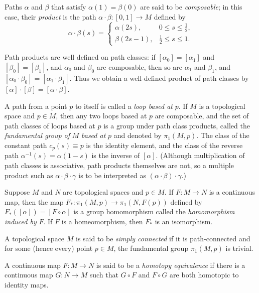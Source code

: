 Paths $\alpha$ and $\beta$ that satisfy $\alpha(1) = \beta(0)$ are said to be \emph{composable}; in this case,
their \emph{product} is the path $\alpha \cdot \beta : [0,1] \to M$ defined by
\[
\alpha \cdot \beta(s) = \begin{cases}
\alpha(2s), & 0 \le s \le \tfrac{1}{2}, \\
\beta(2s-1), & \tfrac{1}{2} \le s \le 1.
\end{cases}
\]

Path products are well defined on path classes: if $[\alpha_0] = [\alpha_1]$ and $[\beta_0] = [\beta_1]$, and
$\alpha_0$ and $\beta_0$ are composable, then so are $\alpha_1$ and $\beta_1$, and $[\alpha_0 \cdot \beta_0] = [\alpha_1 \cdot \beta_1]$. Thus we
obtain a well-defined product of path classes by $[\alpha] \cdot [\beta] = [\alpha \cdot \beta]$.

A path from a point $p$ to itself is called a \emph{loop based at} $p$. If $M$ is a topological
space and $p \in M$, then any two loops based at $p$ are composable, and the set of
path classes of loops based at $p$ is a group under path class products, called the
\emph{fundamental group of} $M$ \emph{based at} $p$ and denoted by $\pi_1(M, p)$. The class of the
constant path $c_p(s) \equiv p$ is the identity element, and the class of the reverse path
$\alpha^{-1}(s) = \alpha(1-s)$ is the inverse of $[\alpha]$. (Although multiplication of path classes is
associative, path products themselves are not, so a multiple product such as $\alpha \cdot \beta \cdot \gamma$
is to be interpreted as $(\alpha \cdot \beta) \cdot \gamma$.)

\begin{proposition}
\label{prop:induced-homomorphisms}
Suppose $M$ and $N$ are topological spaces and $p \in M$. If $F: M \to N$ is a continuous
map, then the map $F_*: \pi_1(M, p) \to \pi_1(N, F(p))$ defined by $F_*([\alpha]) = [F \circ \alpha]$
is a group homomorphism called the \emph{homomorphism induced by} $F$. If $F$ is a homeomorphism, then $F_*$ is an isomorphism.
\end{proposition}

A topological space $M$ is said to be \emph{simply connected} if it is path-connected and
for some (hence every) point $p \in M$, the fundamental group $\pi_1(M, p)$ is trivial.

A continuous map $F: M \to N$ is said to be a \emph{homotopy equivalence} if there is
a continuous map $G: N \to M$ such that $G \circ F$ and $F \circ G$ are both homotopic to
identity maps.

